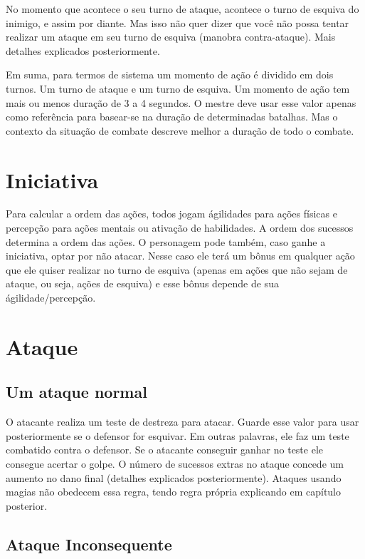 	No momento que acontece o seu turno de ataque, acontece o turno de esquiva do inimigo, e assim por diante. Mas isso não quer dizer que você não possa tentar realizar um ataque em seu turno de esquiva (manobra contra-ataque). Mais detalhes explicados posteriormente.
	
	Em suma, para termos de sistema um momento de ação é dividido em dois turnos. Um turno de ataque e um turno de esquiva. Um momento de ação tem mais ou menos duração de 3 a 4 segundos.  O mestre deve usar esse valor apenas como referência para basear-se na duração de determinadas batalhas. Mas o contexto da situação de combate descreve melhor a duração de todo o combate. 

\section{Iniciativa}

Para calcular a ordem das ações, todos jogam ágilidades para ações físicas e percepção para ações mentais ou ativação de habilidades. A ordem dos sucessos determina a ordem das ações. 
O personagem pode também, caso ganhe a iniciativa, optar por não atacar. Nesse caso ele terá um bônus em qualquer ação que ele quiser realizar no turno de esquiva (apenas em ações que não sejam de ataque, ou seja, ações de esquiva) e esse bônus depende de sua ágilidade/percepção. 

\section{Ataque}

\subsection{Um ataque normal}

O atacante realiza um teste de destreza para atacar. Guarde esse valor para usar posteriormente se o defensor for esquivar. Em outras palavras, ele faz um teste combatido contra o defensor. Se o atacante conseguir ganhar no teste ele consegue acertar o golpe. O número de sucessos extras no ataque concede um aumento no dano final (detalhes explicados posteriormente).
Ataques usando magias não obedecem essa regra, tendo regra própria explicando em capítulo posterior.

\subsection{Ataque Inconsequente}

